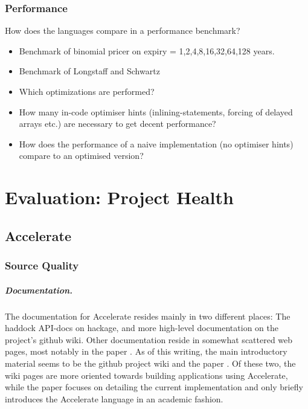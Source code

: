 \subsection{Performance} How does the languages compare in a
performance benchmark?
\begin{itemize}
\item Benchmark of binomial pricer on expiry = 1,2,4,8,16,32,64,128 years.
\item Benchmark of Longstaff and Schwartz
\item Which optimizations are performed?
\item How many in-code optimiser hints (inlining-statements, forcing
  of delayed arrays etc.) are necessary to get decent performance?
\item How does the performance of a naive implementation (no
  optimiser hints) compare to an optimised version?
\end{itemize}



\chapter{Evaluation: Project Health}

\section{Accelerate}
\subsection{Source Quality}

\paragraph{Documentation.} The documentation for Accelerate resides mainly in
two different places: The haddock API-docs on hackage, and more high-level
documentation on the project's github wiki.  Other documentation reside in
somewhat scattered web pages, most notably in the paper
\cite{chakravarty2011accelerating}.  As of this writing, the main introductory
material seems to be the github project wiki and the paper
\cite{chakravarty2011accelerating}. Of these two, the wiki pages are more
oriented towards building applications using Accelerate, while the paper
focuses on detailing the current implementation and only briefly introduces the
Accelerate language in an academic fashion.

